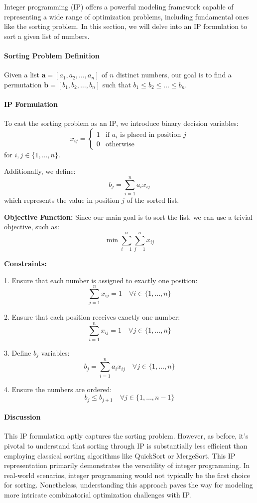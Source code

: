 Integer programming (IP) offers a powerful modeling framework capable of representing a wide range of optimization problems, including fundamental ones like the sorting problem. In this section, we will delve into an IP formulation to sort a given list of numbers.

\paragraph{Sorting Problem Definition}
Given a list \( \mathbf{a} = [a_1, a_2, \ldots, a_n] \) of \( n \) distinct numbers, our goal is to find a permutation \( \mathbf{b} = [b_1, b_2, \ldots, b_n] \) such that \( b_1 \leq b_2 \leq \ldots \leq b_n \).

\paragraph{IP Formulation}
To cast the sorting problem as an IP, we introduce binary decision variables:
\[ x_{ij} = 
\begin{cases} 
1 & \text{if } a_i \text{ is placed in position } j \\
0 & \text{otherwise} 
\end{cases}
\]
for \( i, j \in \{1, \ldots, n\} \).

Additionally, we define:
\[ b_j = \sum_{i=1}^{n} a_i x_{ij} \]
which represents the value in position \( j \) of the sorted list.

\textbf{Objective Function:} Since our main goal is to sort the list, we can use a trivial objective, such as:
\[ \min \sum_{i=1}^{n} \sum_{j=1}^{n} x_{ij} \]

\textbf{Constraints:}

1. Ensure that each number is assigned to exactly one position:
\[ \sum_{j=1}^{n} x_{ij} = 1 \quad \forall i \in \{1, \ldots, n\} \]

2. Ensure that each position receives exactly one number:
\[ \sum_{i=1}^{n} x_{ij} = 1 \quad \forall j \in \{1, \ldots, n\} \]

3. Define \( b_j \) variables:
\[ b_j = \sum_{i=1}^{n} a_i x_{ij} \quad \forall j \in \{1, \ldots, n\} \]

4. Ensure the numbers are ordered:
\[ b_j \leq b_{j+1} \quad \forall j \in \{1, \ldots, n-1\} \]

\paragraph{Discussion}
This IP formulation aptly captures the sorting problem. However, as before, it's pivotal to understand that sorting through IP is substantially less efficient than employing classical sorting algorithms like QuickSort or MergeSort. This IP representation primarily demonstrates the versatility of integer programming. In real-world scenarios, integer programming would not typically be the first choice for sorting. Nonetheless, understanding this approach paves the way for modeling more intricate combinatorial optimization challenges with IP.




